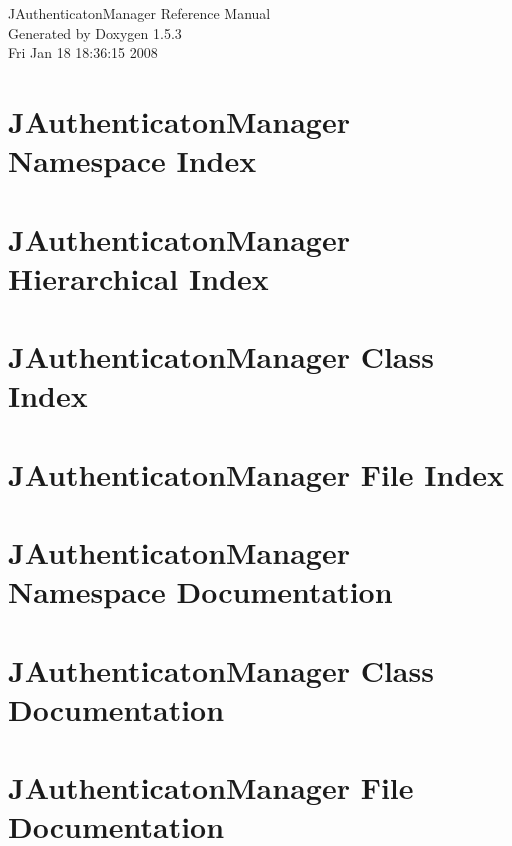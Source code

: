 \documentclass[a4paper]{book}
\begin{document}
\begin{titlepage}
\vspace*{7cm}
\begin{center}
{\Large JAuthenticatonManager Reference Manual}\\
\vspace*{1cm}
{\large Generated by Doxygen 1.5.3}\\
\vspace*{0.5cm}
{\small Fri Jan 18 18:36:15 2008}\\
\end{center}
\end{titlepage}
\clearemptydoublepage
{}
\tableofcontents
\clearemptydoublepage
{}
\chapter{JAuthenticatonManager Namespace Index}

\chapter{JAuthenticatonManager Hierarchical Index}

\chapter{JAuthenticatonManager Class Index}

\chapter{JAuthenticatonManager File Index}

\chapter{JAuthenticatonManager Namespace Documentation}

\chapter{JAuthenticatonManager Class Documentation}









\chapter{JAuthenticatonManager File Documentation}







\printindex
\end{document}
